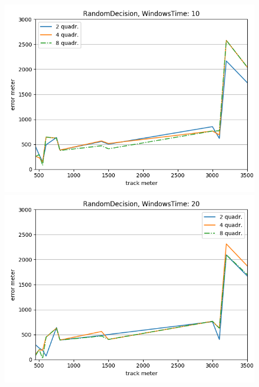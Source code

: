 \documentclass[12pt,a4paper,openright,twoside]{report}
\begin{document}
\begin{figure}[H]
\centering  
\includegraphics[scale=0.4]{thirdChartRandomDecision-10} 
\includegraphics[scale=0.4]{thirdChartRandomDecision-20} 
\end{figure}
\end{document}
